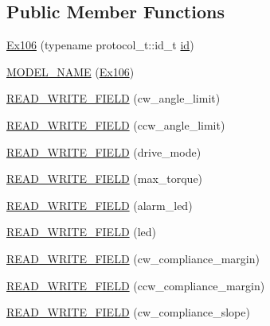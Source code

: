 \subsection*{Public Member Functions}
\begin{DoxyCompactItemize}
\item 
\hyperlink{classdynamixel_1_1servos_1_1_ex106_a5cb026fbd80322f319f7a9a6c27f4ecb}{Ex106} (typename protocol\+\_\+t\+::id\+\_\+t \hyperlink{classdynamixel_1_1servos_1_1_servo_a2d022081672e25a7bb57b76706e1cc57}{id})
\item 
\hyperlink{classdynamixel_1_1servos_1_1_ex106_ae13ecc7eb9c34da20d8d11f3f4600f95}{M\+O\+D\+E\+L\+\_\+\+N\+A\+M\+E} (\hyperlink{classdynamixel_1_1servos_1_1_ex106}{Ex106})
\item 
\hyperlink{classdynamixel_1_1servos_1_1_ex106_a6c548d2096483b62497719ac81d9f7be}{R\+E\+A\+D\+\_\+\+W\+R\+I\+T\+E\+\_\+\+F\+I\+E\+L\+D} (cw\+\_\+angle\+\_\+limit)
\item 
\hyperlink{classdynamixel_1_1servos_1_1_ex106_acddf5380832396bc8c9955f24d74d7d0}{R\+E\+A\+D\+\_\+\+W\+R\+I\+T\+E\+\_\+\+F\+I\+E\+L\+D} (ccw\+\_\+angle\+\_\+limit)
\item 
\hyperlink{classdynamixel_1_1servos_1_1_ex106_a33f7abd9665a5544b0c351a69c58ff77}{R\+E\+A\+D\+\_\+\+W\+R\+I\+T\+E\+\_\+\+F\+I\+E\+L\+D} (drive\+\_\+mode)
\item 
\hyperlink{classdynamixel_1_1servos_1_1_ex106_a5b5f02e57f126fbcbabd7684a2f79c71}{R\+E\+A\+D\+\_\+\+W\+R\+I\+T\+E\+\_\+\+F\+I\+E\+L\+D} (max\+\_\+torque)
\item 
\hyperlink{classdynamixel_1_1servos_1_1_ex106_a5ae3807680fc66b17851cd5be6f78013}{R\+E\+A\+D\+\_\+\+W\+R\+I\+T\+E\+\_\+\+F\+I\+E\+L\+D} (alarm\+\_\+led)
\item 
\hyperlink{classdynamixel_1_1servos_1_1_ex106_aca25b23f0ee40a0d57f8d91b90127643}{R\+E\+A\+D\+\_\+\+W\+R\+I\+T\+E\+\_\+\+F\+I\+E\+L\+D} (led)
\item 
\hyperlink{classdynamixel_1_1servos_1_1_ex106_a799bce434006422ae17e535b8e0e1300}{R\+E\+A\+D\+\_\+\+W\+R\+I\+T\+E\+\_\+\+F\+I\+E\+L\+D} (cw\+\_\+compliance\+\_\+margin)
\item 
\hyperlink{classdynamixel_1_1servos_1_1_ex106_a56b71253ea81d01ef0b80fa0882a861d}{R\+E\+A\+D\+\_\+\+W\+R\+I\+T\+E\+\_\+\+F\+I\+E\+L\+D} (ccw\+\_\+compliance\+\_\+margin)
\item 
\hyperlink{classdynamixel_1_1servos_1_1_ex106_a5763b2f7b4f88d08e5e77dcaad42b956}{R\+E\+A\+D\+\_\+\+W\+R\+I\+T\+E\+\_\+\+F\+I\+E\+L\+D} (cw\+\_\+compliance\+\_\+slope)
\item 

\end{DoxyCompactItemize}
